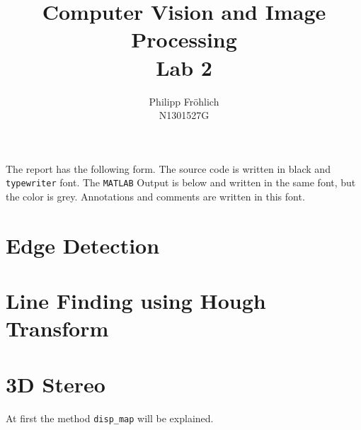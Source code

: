 \documentclass[12pt,a4paper]{scrartcl}
\author{Philipp Fröhlich\\ N1301527G}
\title{Computer Vision and Image Processing\\ Lab 2}
\begin{document}
\maketitle
\thispagestyle{empty}

The report has the following form. The source code is written in black and \texttt{typewriter} font. The \texttt{MATLAB} Output is below and written in the same font, but the color is {\color{lightgray} grey}. Annotations and comments are written in this font.
\tableofcontents
\newpage

\section{Edge Detection}

\newpage

\section{Line Finding using Hough Transform}

\newpage


\section{3D Stereo}
At first the method \texttt{disp\_map} will be explained.

\newpage

\end{document}
